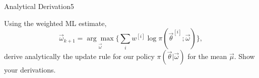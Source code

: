 \begin{questions}


\begin{question}{Analytical Derivation}{5}

Using the weighted ML estimate,
\begin{equation}
    \vec{\omega}_{k+1} = \underset{\vec \omega}{\arg\max} \{ \sum_i w^{[i]} \log \pi(\vec{\theta}^{[i]};\vec{\omega})\},
\end{equation}
derive analytically the update rule for our policy $\pi(\vec{\theta}|\vec{\omega})$ for the mean $\vec{\mu}$. Show your derivations.

\begin{answer}

\end{answer}

\end{question}




\end{questions}
